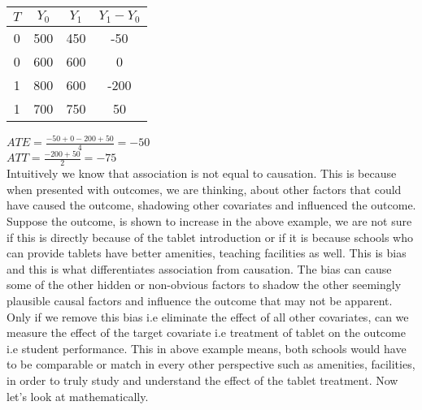 \documentclass{article}
\begin{document}
\begin{tabular}{|c c c c|}
$T$ & $Y_0$ & $Y_1$ & $Y_1 - Y_0$\\
\hline
0 & 500 & 450 & -50\\
0 & 600 & 600 & 0\\
1 & 800 & 600 & -200\\
1 & 700 & 750 & 50
\end{tabular}
$ATE = \frac{-50 + 0 - 200 + 50}{4} = -50$\\
$ATT = \frac{-200 + 50}{2} = -75$\\

Intuitively we know that association is not equal to causation. This is because when presented with outcomes, we are thinking,
about other factors that could have caused the outcome, shadowing other covariates and influenced the outcome. Suppose the outcome,
is shown to increase in the above example, we are not sure if this is directly because of the tablet introduction or if it is because
schools who can provide tablets have better amenities, teaching facilities as well. This is bias and this is what differentiates
association from causation. The bias can cause some of the other hidden or non-obvious factors to shadow the other seemingly plausible
causal factors and influence the outcome that may not be apparent. Only if we remove this bias i.e eliminate the effect of all other covariates,
can we measure the effect of the target covariate i.e treatment of tablet on the outcome i.e student performance. This in above example means,
both schools would have to be comparable or match in every other perspective such as amenities, facilities, in order to truly study and understand
the effect of the tablet treatment. Now let's look at mathematically.\\
\end{document}
